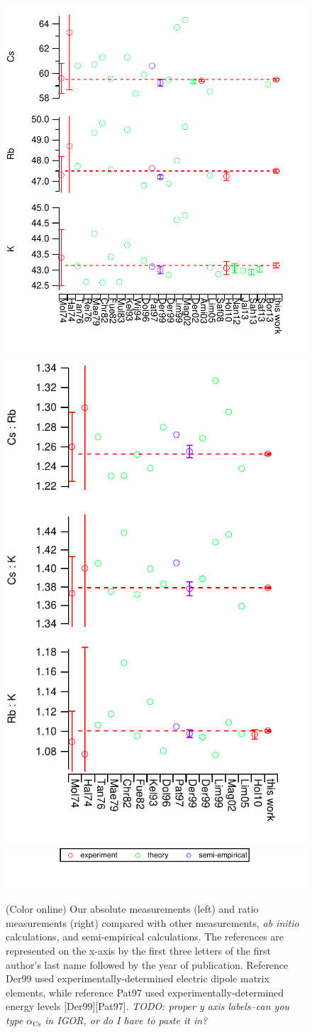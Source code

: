 \documentclass[twocolumn, prl,showpacs,superscriptaddress]{revtex4-1}   %
\newcommand{\acs}{\alpha_{\textrm{Cs}}}
\begin{document}
\begin{figure}
\includegraphics[width=0.59\linewidth,keepaspectratio]{displayAbsComps.pdf}
\includegraphics[width=0.4\linewidth,keepaspectratio]{displayRatComps.pdf}
\includegraphics[width=0.55\linewidth,keepaspectratio]{displayCompsLegend.pdf}
\caption{\label{comparisons}(Color online) Our absolute measurements (left) and ratio measurements (right) compared with other measurements, \textit{ab initio} calculations, and semi-empirical calculations. The references are represented on the x-axis by the first three letters of the first author's last name followed by the year of publication. Reference Der99 used experimentally-determined electric dipole matrix elements, while reference Pat97 used experimentally-determined energy levels [Der99][Pat97]. \textit{TODO: proper y axis labels--can you type $\acs$ in IGOR, or do I have to paste it in?}}
\end{figure}
\end{document}
